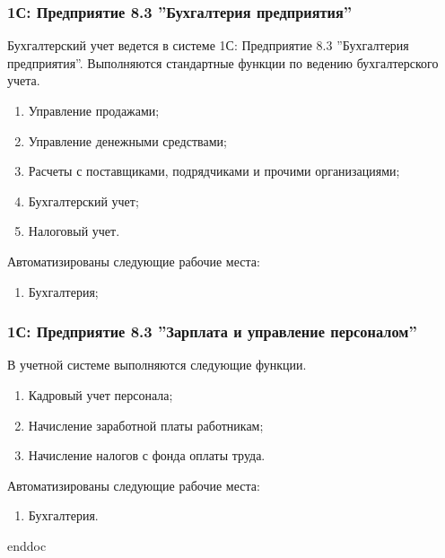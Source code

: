 \subsubsection{1С: Предприятие 8.3 ''Бухгалтерия предприятия''}

Бухгалтерский учет ведется в системе 1С: Предприятие 8.3 ''Бухгалтерия предприятия''.
Выполняются стандартные функции по ведению бухгалтерского учета.

\begin{enumerate}
\item Управление продажами;
\item Управление денежными средствами;
\item Расчеты с поставщиками, подрядчиками и прочими организациями;
\item Бухгалтерский учет;
\item Налоговый учет.
\end{enumerate}

Автоматизированы следующие рабочие места:
\begin{enumerate}
\item Бухгалтерия;
\end{enumerate}



%
\subsubsection{1С: Предприятие 8.3 ''Зарплата и управление персоналом''}
В учетной системе выполняются следующие функции.
\begin{enumerate}
\item Кадровый учет персонала;
\item Начисление заработной платы работникам;
\item Начисление налогов с фонда оплаты труда.
\end{enumerate}

Автоматизированы следующие рабочие места:
\begin{enumerate}
\item Бухгалтерия.
\end{enumerate}


 {enddoc} 